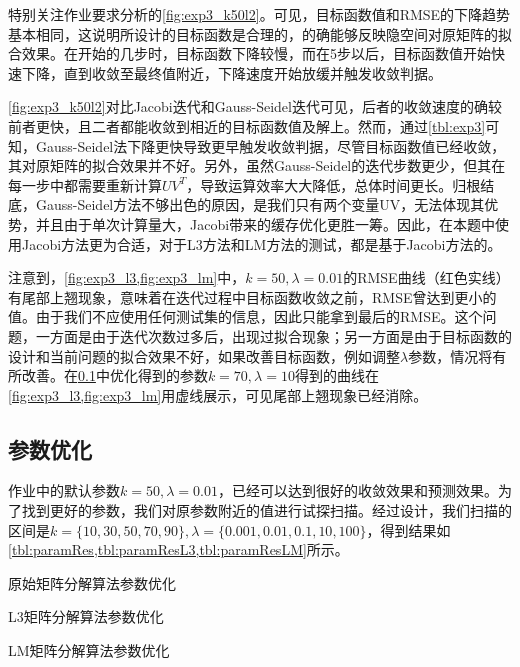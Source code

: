 \documentclass[a4paper,12pt]{article}
\begin{document}
    特别关注作业要求分析的\cref{fig:exp3_k50l2}。可见，目标函数值和RMSE的下降趋势基本相同，这说明所设计的目标函数是合理的，的确能够反映隐空间对原矩阵的拟合效果。在开始的几步时，目标函数下降较慢，而在5步以后，目标函数值开始快速下降，直到收敛至最终值附近，下降速度开始放缓并触发收敛判据。

    \cref{fig:exp3_k50l2}对比Jacobi迭代和Gauss-Seidel迭代可见，后者的收敛速度的确较前者更快，且二者都能收敛到相近的目标函数值及解上。然而，通过\cref{tbl:exp3}可知，Gauss-Seidel法下降更快导致更早触发收敛判据，尽管目标函数值已经收敛，其对原矩阵的拟合效果并不好。另外，虽然Gauss-Seidel的迭代步数更少，但其在每一步中都需要重新计算$UV^T$，导致运算效率大大降低，总体时间更长。归根结底，Gauss-Seidel方法不够出色的原因，是我们只有两个变量UV，无法体现其优势，并且由于单次计算量大，Jacobi带来的缓存优化更胜一筹。因此，在本题中使用Jacobi方法更为合适，对于L3方法和LM方法的测试，都是基于Jacobi方法的。

    注意到，\cref{fig:exp3_l3,fig:exp3_lm}中，$k=50,\lambda=0.01$的RMSE曲线（红色实线）有尾部上翘现象，意味着在迭代过程中目标函数收敛之前，RMSE曾达到更小的值。由于我们不应使用任何测试集的信息，因此只能拿到最后的RMSE。这个问题，一方面是由于迭代次数过多后，出现过拟合现象；另一方面是由于目标函数的设计和当前问题的拟合效果不好，如果改善目标函数，例如调整$\lambda$参数，情况将有所改善。在\cref{sub:param}中优化得到的参数$k=70,\lambda=10$得到的曲线在\cref{fig:exp3_l3,fig:exp3_lm}用虚线展示，可见尾部上翘现象已经消除。

    \subsection{参数优化}
    \label{sub:param}
    作业中的默认参数$k=50,\lambda=0.01$，已经可以达到很好的收敛效果和预测效果。为了找到更好的参数，我们对原参数附近的值进行试探扫描。经过设计，我们扫描的区间是$k=\{10,30,50,70,90\},\lambda=\{0.001,0.01,0.1,10,100\}$，得到结果如\cref{tbl:paramRes,tbl:paramResL3,tbl:paramResLM}所示。

    \begin{table}[htbp]
      \centering
      \caption{原始矩阵分解算法参数优化}
      \label{tbl:paramRes}
      
    \end{table}
    \begin{table}[htbp]
      \centering
      \caption{L3矩阵分解算法参数优化}
      \label{tbl:paramResL3}
      
    \end{table}
    \begin{table}[htbp]
      \centering
      \caption{LM矩阵分解算法参数优化}
      \label{tbl:paramResLM}
      
    \end{table}
\end{document}
